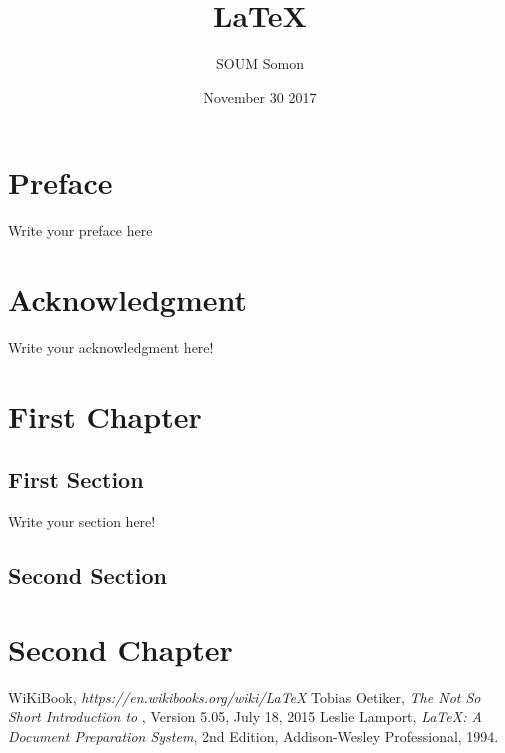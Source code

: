 \documentclass[a4paper, 12pt]{book}
\title{\LaTeX{}}
\author{SOUM Somon}
\date{November 30 2017}
\begin{document}
	\mainmatter
	\maketitle
	\tableofcontents
	\chapter{Preface}
	Write your preface here
	\chapter{Acknowledgment}
	Write your acknowledgment here!
	\mainmatter
	\chapter{First Chapter}
	\section{First Section}
	Write your section here!
	\section{Second Section}
	\chapter{Second Chapter}
	\backmatter
	\begin{thebibliography}{3}
		 WiKiBook, \emph{https://en.wikibooks.org/wiki/LaTeX}
		 Tobias Oetiker, \emph{The Not So Short Introduction
			to \LaTeXe}, Version 5.05, July 18, 2015
		 Leslie Lamport, \emph{\LaTeX: A Document Preparation
			System}, 2nd Edition, Addison-Wesley Professional, 1994.
	\end{thebibliography}
\end{document}
